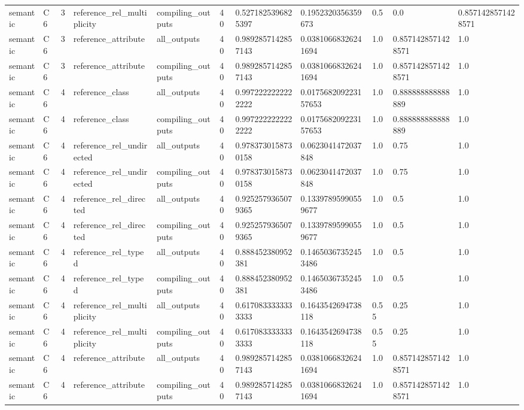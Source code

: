\begin{tabular}{lllllllllll}
semantic & C6 & 3 & reference\_rel\_multiplicity & compiling\_outputs & 40 & 0.5271825396825397 & 0.1952320356359673 & 0.5 & 0.0 & 0.8571428571428571 \\
semantic & C6 & 3 & reference\_attribute & all\_outputs & 40 & 0.9892857142857143 & 0.03810668326241694 & 1.0 & 0.8571428571428571 & 1.0 \\
semantic & C6 & 3 & reference\_attribute & compiling\_outputs & 40 & 0.9892857142857143 & 0.03810668326241694 & 1.0 & 0.8571428571428571 & 1.0 \\
semantic & C6 & 4 & reference\_class & all\_outputs & 40 & 0.9972222222222222 & 0.017568209223157653 & 1.0 & 0.888888888888889 & 1.0 \\
semantic & C6 & 4 & reference\_class & compiling\_outputs & 40 & 0.9972222222222222 & 0.017568209223157653 & 1.0 & 0.888888888888889 & 1.0 \\
semantic & C6 & 4 & reference\_rel\_undirected & all\_outputs & 40 & 0.9783730158730158 & 0.0623041472037848 & 1.0 & 0.75 & 1.0 \\
semantic & C6 & 4 & reference\_rel\_undirected & compiling\_outputs & 40 & 0.9783730158730158 & 0.0623041472037848 & 1.0 & 0.75 & 1.0 \\
semantic & C6 & 4 & reference\_rel\_directed & all\_outputs & 40 & 0.9252579365079365 & 0.13397895990559677 & 1.0 & 0.5 & 1.0 \\
semantic & C6 & 4 & reference\_rel\_directed & compiling\_outputs & 40 & 0.9252579365079365 & 0.13397895990559677 & 1.0 & 0.5 & 1.0 \\
semantic & C6 & 4 & reference\_rel\_typed & all\_outputs & 40 & 0.888452380952381 & 0.14650367352453486 & 1.0 & 0.5 & 1.0 \\
semantic & C6 & 4 & reference\_rel\_typed & compiling\_outputs & 40 & 0.888452380952381 & 0.14650367352453486 & 1.0 & 0.5 & 1.0 \\
semantic & C6 & 4 & reference\_rel\_multiplicity & all\_outputs & 40 & 0.6170833333333333 & 0.1643542694738118 & 0.55 & 0.25 & 1.0 \\
semantic & C6 & 4 & reference\_rel\_multiplicity & compiling\_outputs & 40 & 0.6170833333333333 & 0.1643542694738118 & 0.55 & 0.25 & 1.0 \\
semantic & C6 & 4 & reference\_attribute & all\_outputs & 40 & 0.9892857142857143 & 0.03810668326241694 & 1.0 & 0.8571428571428571 & 1.0 \\
semantic & C6 & 4 & reference\_attribute & compiling\_outputs & 40 & 0.9892857142857143 & 0.03810668326241694 & 1.0 & 0.8571428571428571 & 1.0 \\

\end{tabular}
